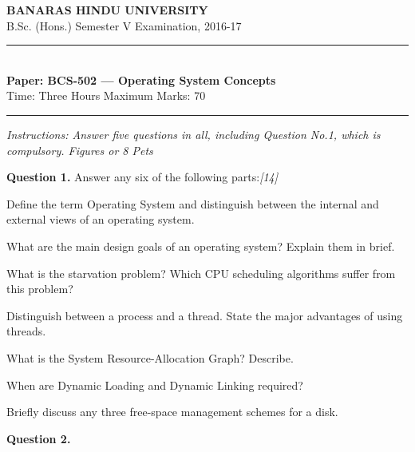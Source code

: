 \documentclass[11pt,a4paper]{article}
\newcommand{\pts}[1]{\hfill   \textit{[#1]}}
\begin{document}
\begin{center}
  {\large\bfseries BANARAS HINDU UNIVERSITY}\\[2pt]
  {
\normalsize B.Sc. (Hons.) Semester V Examination, 2016-17}\\[6pt]
  \rule{0.8\linewidth}{0.5pt}\\[6pt]
  {\large\bfseries Paper: BCS-502 --- Operating System Concepts}\\[4pt]
  {
\normalsize Time: Three Hours \hfill Maximum Marks: 70}
\end{center}

\rule{\linewidth}{0.4pt}

\smallskip



\noindent   \textit{Instructions: Answer five questions in all, including Question No.1, which is compulsory. Figures or 8 Pets}

\bigskip

\medskip


\noindent   \textbf{Question 1.} Answer any six of the following parts:\pts{14}

\begin{parts}
  \item Define the term Operating System and distinguish between the internal and external views of an operating system.
  \item What are the main design goals of an operating system? Explain them in brief.
  \item What is the starvation problem? Which CPU scheduling algorithms suffer from this problem?
  \item Distinguish between a process and a thread. State the major advantages of using threads.
  \item What is the System Resource-Allocation Graph? Describe.
  \item When are Dynamic Loading and Dynamic Linking required?
  \item Briefly discuss any three free-space management schemes for a disk.
\end{parts}

\medskip


\noindent   \textbf{Question 2.}
\end{document}

